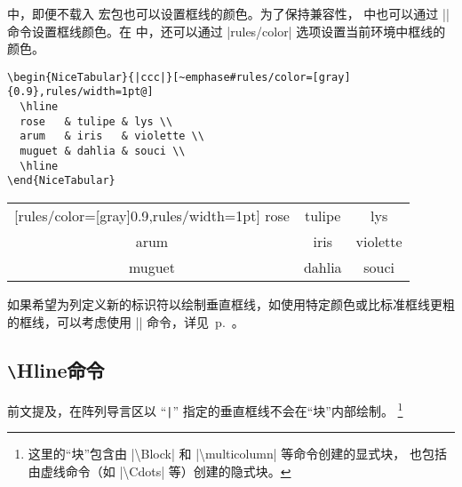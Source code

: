 \documentclass[dvipsnames]{article}%
\begin{document}
 中，即便不载入  宏包也可以设置框线的颜色。为了保持兼容性， 中也可以通过 |\arrayrulecolor|命令设置框线颜色。在  中，还可以通过 |rules/color| 选项设置当前环境中框线的颜色。

\bigskip
\begin{scope}
\hfuzz=10cm
\begin{BVerbatim}[baseline=c,boxwidth=9.5cm]
\begin{NiceTabular}{|ccc|}[~emphase#rules/color=[gray]{0.9},rules/width=1pt@]
  \hline
  rose   & tulipe & lys \\
  arum   & iris   & violette \\
  muguet & dahlia & souci \\
  \hline
\end{NiceTabular}
\end{BVerbatim}
\begin{NiceTabular}{|ccc|}[rules/color=[gray]{0.9},rules/width=1pt]
\hline
rose & tulipe & lys \\
arum & iris & violette \\
muguet & dahlia & souci \\
\hline
\end{NiceTabular}
\end{scope}

\medskip
如果希望为列定义新的标识符以绘制垂直框线，如使用特定颜色或比标准框线更粗的框线，可以考虑使用 |\OnlyMainNiceMatrix| 命令，详见~p.~\pageref{OnlyMainNiceMatrix}。

\subsection{\texttt{\textbackslash}Hline命令}

前文提及，在阵列导言区以 “\verb+|+” 指定的垂直框线不会在“块”内部绘制。
\footnote{这里的“块”包含由 |\textbackslash Block| 和 |\textbackslash multicolumn| 等命令创建的显式块，
也包括由虚线命令（如 |\textbackslash Cdots| 等）创建的隐式块。}
\smallskip
\end{document}
